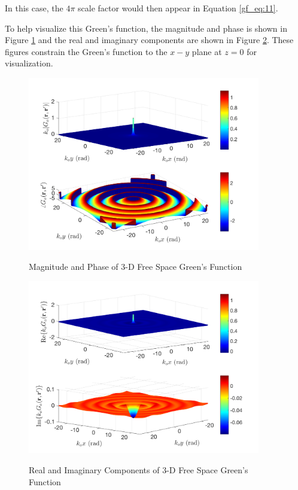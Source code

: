 \noindent In this case, the $4\pi$ scale factor would then appear in Equation \ref{gf_eq:11}.

To help visualize this Green's function, the magnitude and phase is shown in Figure \ref{gf_fig:1} and the real and imaginary components are shown in Figure \ref{gf_fig:2}. These figures constrain the Green's function to the $x-y$ plane at $z=0$ for visualization.

\begin{figure}[ht]
\begin{center}
\includegraphics[width=4in]{../media/3d_fs_gf_mag.png}
\end{center}
\renewcommand{\baselinestretch}{1}
\small\normalsize
\begin{quote}
\caption[Magnitude and Phase of 3-D Free Space Green's Function]{ Magnitude and Phase of 3-D Free Space Green's Function\label{gf_fig:1}}
\end{quote}
\end{figure} 
\renewcommand{\baselinestretch}{2}
\small\normalsize

\begin{figure}[ht]
\begin{center}
\includegraphics[width=4in]{../media/3d_fs_gf_re_im.png}
\end{center}
\renewcommand{\baselinestretch}{1}
\small\normalsize
\begin{quote}
\caption[Real and Imaginary Components of 3-D Free Space Green's Function]{Real and Imaginary Components of 3-D Free Space Green's Function \label{gf_fig:2}}
\end{quote}
\end{figure} 
\renewcommand{\baselinestretch}{2}
\small\normalsize

